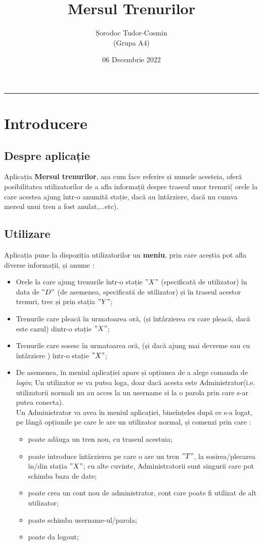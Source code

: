 \documentclass{article}
\title{Mersul Trenurilor}
\author{Șorodoc Tudor-Cosmin \\ (Grupa A4)}
\date{06 Decembrie 2022}
\begin{document}
\maketitle
{\color{gray} \rule{\linewidth}{0.75mm}}

\section{Introducere}
\subsection{Despre aplicație}
Aplicația \textbf{Mersul trenurilor}, așa cum face referire și numele acesteia, oferă posibilitatea utilizatorilor de a afla informații despre traseul unor trenuri( orele la care acestea ajung într-o anumită stație, dacă au întârziere, dacă nu cumva mersul unui tren a fost anulat,...etc).
\subsection{Utilizare}
Aplicația pune la dispoziția utilizatorilor un \textbf{meniu}, prin care aceștia pot afla diverse informații, și anume :
\begin{itemize}
	\itemsep0em
	\item Orele la care ajung trenurile într-o stație $" X "$ (specificată de utilizator) în data de $"D"$ (de asemenea, specificată de utilizator) și în traseul acestor trenuri, trec și prin stația $"Y"$;
	\item Trenurile care pleacă în urmatoarea oră, (și întârzierea cu care pleacă, dacă este cazul) dintr-o stație $"X"$;
        \item Trenurile care sosesc în urmatoarea oră, (și dacă ajung mai devreme sau cu întârziere ) într-o stație $"X"$;
        \item De asemenea, în meniul aplicației apare și opțiunea de a alege comanda de \textit{login};
Un utilizator se va putea loga, doar dacă acesta este Administrator(i.e. utilizatorii normali nu au acces la un username si la o parola prin care s-ar putea conecta).\\
       Un Administrator va avea în meniul aplicației, bineînțeles după ce s-a logat, pe lângă opțiunile pe care le are un utilizator normal, și comenzi prin care :
	\begin{itemize}
		\itemsep0em
		\item poate adăuga un tren nou, cu traseul acestuia;
		\item poate introduce întârzierea pe care o are un tren $"T"$, la sosirea/plecarea în/din stația $"X"$; cu alte cuvinte, Administratorii sunt singurii care pot schimba baza de date;
		\item poate crea un cont nou de administrator, cont care poate fi utilizat de alt utilizator;
            \item poate schimba username-ul/parola;
            \item poate da logout;
	\end{itemize}
\end{itemize}
\end{document}
